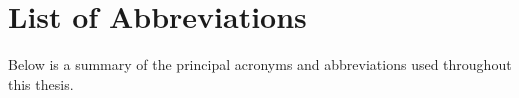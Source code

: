 \documentclass[12pt, oneside, a4paper]{report}
\theoremstyle{definition}
\theoremstyle{remark}
\begin{document}

\cleardoublepage


\chapter*{List of Abbreviations}

Below is a summary of the principal acronyms and abbreviations used throughout this thesis.

\vspace{1.0cm}
\end{document}
